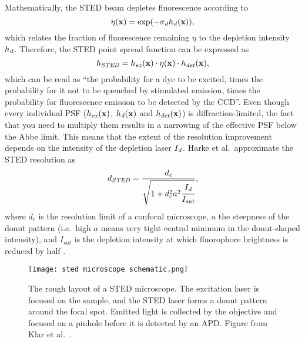 Mathematically, the STED beam depletes fluorescence according to
\begin{equation}
	\eta(\vb{x}) = \exp(-\sigma_{\mathit{d}} h_{\mathit{d}}(\vb{x})),
\end{equation}
which relates the fraction of fluorescence remaining $ \eta $ to the depletion intensity $ h_{\mathit{d}} $. Therefore, the STED point spread function can be expressed as
\begin{equation}
	h_\mathit{STED} = h_{\mathit{ex}}(\vb{x}) \cdot \eta(\vb{x}) \cdot h_\mathit{det}(\vb{x}),
\end{equation}
which can be read as ``the probability for a dye to be excited, times the probability for it not to be quenched by stimulated emission, times the probability for fluorescence emission to be detected by the CCD''. Even though every individual PSF ($ h_{\mathit{ex}}(\vb{x}) $, $ h_{\mathit{d}}(\vb{x}) $ and $ h_\mathit{det}(\vb{x}) $) is diffraction-limited, the fact that you need to multiply them results in a narrowing of the effective PSF below the Abbe limit. This means that the extent of the resolution improvement depends on the intensity of the depletion laser $ I_{\mathit{d}}$. Harke et al.~approximate the STED resolution as
\begin{equation}
	d_\mathit{STED} = \frac{d_c}{\sqrt{1+d_c^2a^2\cfrac{I_{\mathit{d}}}{I_\mathit{sat}}}},
\end{equation}
where $ d_c $ is the resolution limit of a confocal microscope, $ a $ the steepness of the donut pattern (i.e.~high $ a $ means very tight central minimum in the donut-shaped intensity), and $ I_\mathit{sat} $ is the depletion intensity at which fluorophore brightness is reduced by half \cite{Harke2008}.

\begin{figure}
	\centering
	\texttt{[image: sted microscope schematic.png]}
	\caption{
		The rough layout of a STED microscope. The excitation laser is focused on the sample, and the STED laser forms a donut pattern around the focal spot. Emitted light is collected by the objective and focused on a pinhole before it is detected by an APD. Figure from Klar et al.~\cite{Klar2000}.
	}
	\label{fig:sted microscope}
\end{figure}

